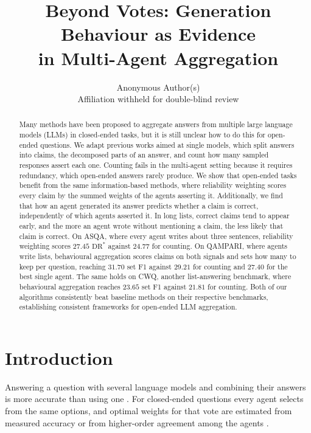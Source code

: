 \documentclass{article}
\title{Beyond Votes: Generation Behaviour as Evidence\\
in Multi-Agent Aggregation}
\author{%
  Anonymous Author(s) \\
  Affiliation withheld for double-blind review \\
}
\begin{document}
\maketitle

\begin{abstract}
  Many methods have been proposed to aggregate answers from multiple large language models (LLMs) in closed-ended tasks, but it is still unclear how to do this for open-ended questions. We adapt previous works aimed at single models, which split answers into claims, the decomposed parts of an answer, and count how many sampled responses assert each one. Counting fails in the multi-agent setting because it requires redundancy, which open-ended answers rarely produce. We show that open-ended tasks benefit from the same information-based methods, where reliability weighting scores every claim by the summed weights of the agents asserting it. Additionally, we find that how an agent generated its answer predicts whether a claim is correct, independently of which agents asserted it. In long lists, correct claims tend to appear early, and the more an agent wrote without mentioning a claim, the less likely that claim is correct. On ASQA, where every agent writes about three sentences, reliability weighting scores $27.45$ $\mathrm{DR}^*$ against $24.77$ for counting. On QAMPARI, where agents write lists, behavioural aggregation scores claims on both signals and sets how many to keep per question, reaching $31.70$ set F1 against $29.21$ for counting and $27.40$ for the best single agent. The same holds on CWQ, another list-answering benchmark, where behavioural aggregation reaches $23.65$ set F1 against $21.81$ for counting. Both of our algorithms consistently beat baseline methods on their respective benchmarks, establishing consistent frameworks for open-ended LLM aggregation.
\end{abstract}

\section{Introduction}
\label{sec:intro}

Answering a question with several language models and combining their answers is more accurate than using one \cite{li2024agents}. For closed-ended questions every agent selects from the same options, and optimal weights for that vote are estimated from measured accuracy or from higher-order agreement among the agents \cite{ai2025majority}.
\end{document}
